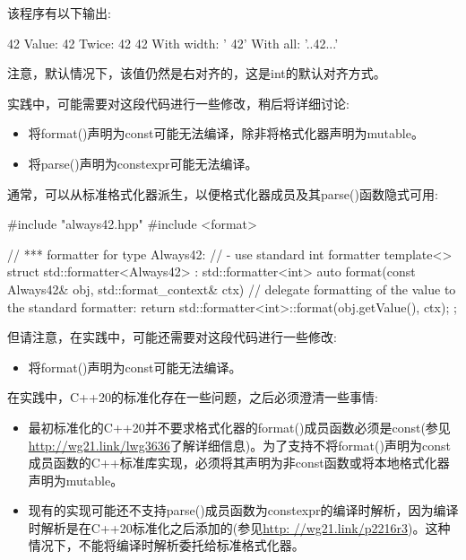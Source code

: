 该程序有以下输出:

\begin{shell}
42
Value: 42
Twice: 42 42
With width: ’     42’
With all:   ’..42...’
\end{shell}

注意，默认情况下，该值仍然是右对齐的，这是int的默认对齐方式。

实践中，可能需要对这段代码进行一些修改，稍后将详细讨论:

\begin{itemize}
\item
将format()声明为const可能无法编译，除非将格式化器声明为mutable。

\item
将parse()声明为constexpr可能无法编译。
\end{itemize}


通常，可以从标准格式化器派生，以便格式化器成员及其parse()函数隐式可用:


\begin{cpp}
#include "always42.hpp"
#include <format>

// *** formatter for type Always42:
// - use standard int formatter
template<>
struct std::formatter<Always42> : std::formatter<int>
{
	auto format(const Always42& obj, std::format_context& ctx) {
		// delegate formatting of the value to the standard formatter:
		return std::formatter<int>::format(obj.getValue(), ctx);
	}
};
\end{cpp}

但请注意，在实践中，可能还需要对这段代码进行一些修改:

\begin{itemize}
\item
将format()声明为const可能无法编译。
\end{itemize}


在实践中，C++20的标准化存在一些问题，之后必须澄清一些事情:

\begin{itemize}
\item
最初标准化的C++20并不要求格式化器的format()成员函数必须是const(参见\url{http://wg21.link/lwg3636}了解详细信息)。为了支持不将format()声明为const成员函数的C++标准库实现，必须将其声明为非const函数或将本地格式化器声明为mutable。

\item
现有的实现可能还不支持parse()成员函数为constexpr的编译时解析，因为编译时解析是在C++20标准化之后添加的(参见\url{http: //wg21.link/p2216r3})。这种情况下，不能将编译时解析委托给标准格式化器。
\end{itemize}

